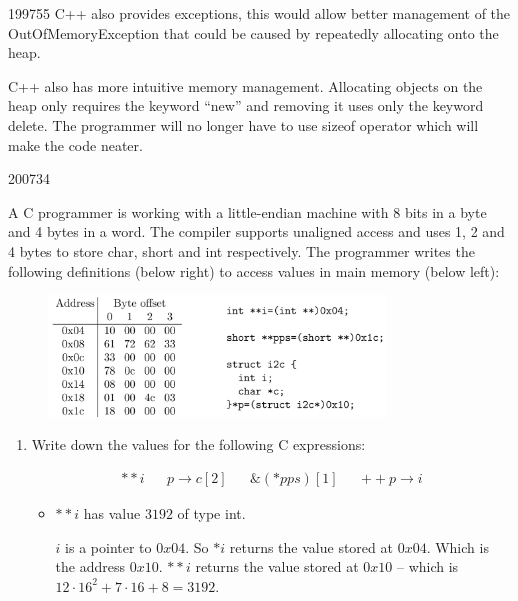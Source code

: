 \documentclass[10pt,\jkfside,a4paper]{article}
\begin{document}
\begin{examquestion}{1997}{5}{5}
C++ also provides exceptions, this would allow better management of the
OutOfMemoryException that could be caused by repeatedly allocating onto the
heap.

C++ also has more intuitive memory management. Allocating objects on the heap
only requires the keyword ``new'' and removing it uses only the keyword delete.
The programmer will no longer have to use sizeof operator which will make
the code neater.

\end{examquestion}

\begin{examquestion}{2007}{3}{4}

A C programmer is working with a little-endian  machine with 8 bits in a 
byte and 4 bytes in a word. The compiler supports unaligned access and uses 
1, 2 and 4 bytes to store char, short and int respectively. The programmer 
writes the following definitions (below right) to access values in main 
memory (below left):

\begin{figure}[H]
    \centering
    \includegraphics[width=0.8\textwidth]{q2_img}
\end{figure}

\begin{enumerate}[label=(\alph*)]

\item Write down the values for the following C expressions:

\begin{align*}
**i & & p\rightarrow c[2] & & \&(*pps)[1] & & ++p\rightarrow i
\end{align*}

\begin{itemize}

\item $**i$ has value $3192$ of type int.

$i$ is a pointer to $0x04$. So $*i$ returns the value stored at $0x04$.
Which is the address $0x10$. $**i$ returns the value stored at $0x10$ --
which is $12 \cdot 16^2 + 7\cdot 16 + 8 = 3192$.


\end{itemize}
\end{enumerate}
\end{examquestion}
\end{document}
